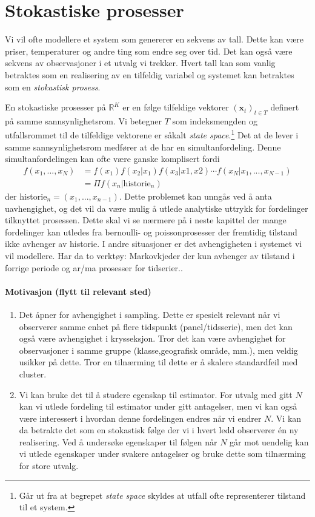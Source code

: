 \chapter{Stokastiske prosesser}
Vi vil ofte modellere et system som genererer en sekvens av tall. Dette kan være priser, temperaturer og andre ting som endre seg over tid. Det kan også være sekvens av observasjoner i et utvalg vi trekker. Hvert tall kan som vanlig betraktes som en realisering av en tilfeldig variabel og systemet kan betraktes som en \textit{stokastisk prosess}.

En stokastiske prosesser på $\mathbb{R}^K$ er en følge tilfeldige vektorer $(\mathbf{x}_t)_{t\in T}$ definert på samme sannsynlighetsrom. Vi betegner $T$  som indeksmengden og utfallsrommet til de tilfeldige vektorene er såkalt \textit{state space}.\footnote{Går ut fra at begrepet \textit{state space} skyldes at utfall ofte representerer tilstand til et system.} Det at de lever i samme sannsynlighetsrom medfører at de har en simultanfordeling. Denne simultanfordelingen kan ofte være ganske komplisert fordi
\begin{align}
f(x_1,...,x_N) &= f(x_1)f(x_2|x_1)f(x_3|x1,x2)\cdots f(x_N|x_1,...,x_{N-1}) \\
&= \Pi f(x_n|\text{historie}_n)
\end{align}
der historie$_n = (x_1,...,x_{n-1})$. Dette problemet kan unngås ved å anta uavhengighet, og det vil da være mulig å utlede analytiske uttrykk for fordelinger tilknyttet prosessen. Dette skal vi se nærmere på i neste kapittel der mange fordelinger kan utledes fra bernoulli- og poissonprosesser der fremtidig tilstand ikke avhenger av historie. I andre situasjoner er det avhengigheten i systemet vi vil modellere. Har da to verktøy: Markovkjeder der kun avhenger av tilstand i forrige periode og ar/ma prosesser for tidserier..
\subsubsection{Motivasjon (flytt til relevant sted)}
\begin{enumerate}
\item Det åpner for avhengighet i sampling. Dette er spesielt relevant når vi observerer samme enhet på flere tidspunkt (panel/tidsserie), men det kan også være avhengighet i krysseksjon. Tror det kan være avhengighet for observasjoner i samme gruppe (klasse,geografisk område, mm.), men veldig usikker på dette. Tror en tilnærming til dette er å skalere standardfeil med cluster.
\item Vi kan bruke det til å studere egenskap til estimator. For utvalg med gitt $N$ kan vi utlede fordeling til estimator under gitt antagelser, men vi kan også være interessert i hvordan denne fordelingen endres når vi endrer $N$. Vi kan da betrakte det som en stokastisk følge der vi i hvert ledd observerer én ny realisering. Ved å undersøke egenskaper til følgen når $N$ går mot uendelig kan vi utlede egenskaper under svakere antagelser og bruke dette som tilnærming for store utvalg.
\end{enumerate}
